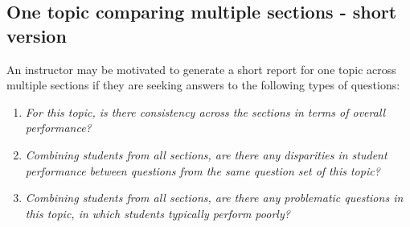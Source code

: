 \documentclass{article}\usepackage[]{graphicx}\usepackage[]{color}
\numberwithin{equation}{section} %
\begin{document}
\begin{center}
\captionsetup{width=\textwidth}
\label{fig:image2c}
\end{center}

\subsection{One topic comparing multiple sections - short version}

An instructor may be motivated to generate a short report for one topic across multiple sections if they are seeking answers to the following types of questions:

\begin{enumerate}
\item \textit{For this topic, is there consistency across the sections in terms of overall performance?}
\item \textit{Combining students from all sections, are there any disparities in student performance between questions from the same question set of this topic?}
\item \textit{Combining students from all sections, are there any problematic questions in this topic, in which students typically perform poorly?}
\end{enumerate}
\end{document}
